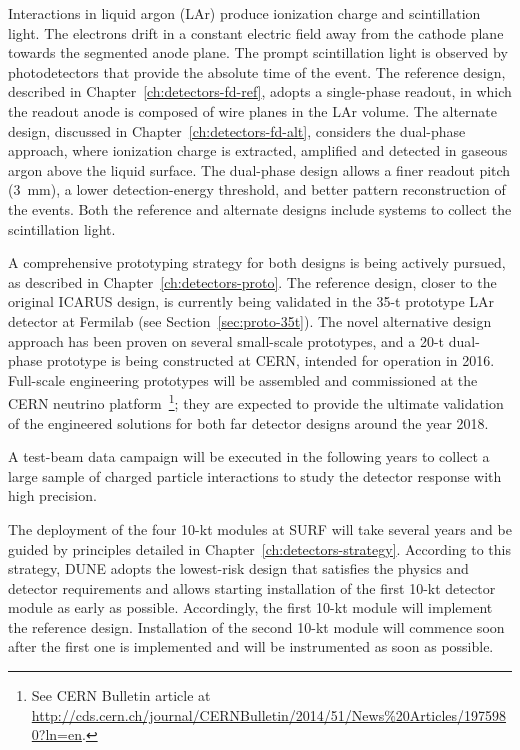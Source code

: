 Interactions in liquid argon (LAr) produce ionization charge and
scintillation light.  The %
electrons drift in a constant electric field
away from the cathode plane towards the segmented anode plane.  The
prompt scintillation light is observed by photodetectors that provide
the absolute time of the event.  The reference design, described in
Chapter~\ref{ch:detectors-fd-ref}, adopts a single-phase readout,
in which the readout anode is composed of wire planes in the LAr
volume.  The alternate design, discussed in
Chapter~\ref{ch:detectors-fd-alt}, considers the dual-phase approach,
where ionization charge is extracted, amplified and detected in
gaseous argon above the liquid surface.  The dual-phase design 
allows a finer readout pitch (3~mm), a lower detection-energy threshold,
and better pattern reconstruction of the events.  
Both the reference and alternate designs include systems to collect the
scintillation light.


A comprehensive prototyping strategy for both designs is being actively
pursued, as described in Chapter~\ref{ch:detectors-proto}.  The
reference design, closer to the original ICARUS design, is currently
being validated in the 35-t prototype LAr detector at Fermilab (see Section~\ref{sec:proto-35t}).  The
novel alternative design approach has been proven on
several small-scale prototypes, and a 20-t dual-phase
prototype %
is being constructed at CERN, intended for
operation in 2016.  Full-scale engineering prototypes will be
assembled and commissioned at the CERN neutrino platform~\footnote{See CERN Bulletin article at \href{http://cds.cern.ch/journal/CERNBulletin/2014/51/News\%20Articles/1975980?ln=en}{http://cds.cern.ch/journal/CERNBulletin/2014/51/News\%20Articles/1975980?ln=en}.}; they are 
expected to provide the ultimate validation of the engineered solutions
for both far detector designs around the year 2018. 

A test-beam data
campaign will be executed in the following years to collect a large
sample of charged particle interactions to study the detector response
with high precision.  %

The deployment of the four 10-kt modules at SURF will take several
years %
and be guided by principles detailed in
Chapter~\ref{ch:detectors-strategy}. According to this strategy, DUNE
 adopts the lowest-risk design that satisfies the
physics and detector requirements %
and allows starting installation of the first 10-kt detector module as early as possible.
Accordingly, the first 10-kt module will implement the reference design.   
Installation of the second 10-kt module will commence
soon after the first one is implemented   %
and will be instrumented as soon as possible. %

